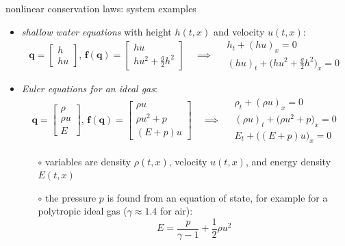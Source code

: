 \documentclass[10pt,dvipsnames,usepdftitle=false,
hyperref={pdftitle = {Finite volume methods},
    pdfauthor = {Ed Bueler}}]{beamer}
\newcommand{\bbf}{\mathbf{f}}
\newcommand{\bq}{\mathbf{q}}
\begin{document}
\begin{frame}{nonlinear conservation laws: system examples}

\begin{itemize}
\item \emph{shallow water equations} with height $h(t,x)$ and velocity $u(t,x)$:
        $$\bq = \begin{bmatrix} h \\ hu \end{bmatrix}, \, \bbf(\bq) = \begin{bmatrix} hu \\ h u^2 + \frac{g}{2} h^2 \end{bmatrix} \quad \implies \quad \begin{matrix} h_t + (hu)_x = 0 \\ (hu)_t + \Big(h u^2 + \frac{g}{2} h^2\Big)_x = 0 \end{matrix}$$
\item \emph{Euler equations for an ideal gas}:
        $$\bq = \begin{bmatrix} \rho \\ \rho u \\ E \end{bmatrix}, \, \bbf(\bq) = \begin{bmatrix} \rho u \\ \rho u^2 + p \\ (E+p) u \end{bmatrix} \quad \implies \quad \begin{matrix} \rho_t + (\rho u)_x = 0 \\ (\rho u)_t + \Big(\rho u^2 + p\Big)_x = 0 \\ E_t + \Big((E+p) u\Big)_x = 0 \end{matrix}$$
    \begin{itemize}
    \item[$\circ$] variables are density $\rho(t,x)$, velocity $u(t,x)$, and energy density $E(t,x)$
    \item[$\circ$] the pressure $p$ is found from an equation of state, for example for a polytropic ideal gas ($\gamma \approx 1.4$ for air):
        $$E = \frac{p}{\gamma - 1} + \frac{1}{2} \rho u^2$$
    \end{itemize}
\end{itemize}
\end{frame}
\end{document}
